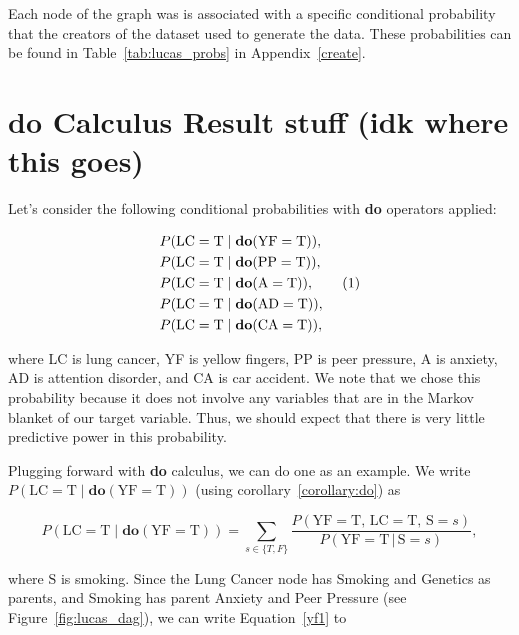 \documentclass{article}
\newcommand\numberthis{\addtocounter{equation}{1}\tag{\theequation}}
\begin{document}
Each node of the graph was is associated with a specific conditional probability that the
creators of the dataset used to generate the data. These probabilities can be found in Table~\ref{tab:lucas_probs}
in Appendix~\ref{create}.


\section{do Calculus Result stuff (idk where this goes)}

Let's consider the following conditional probabilities with \textbf{do} operators applied:

\begin{align*}
    P(\text{LC} = \text{T} \;&|\; \textbf{do}(\text{YF} = \text{T})), \\
    P(\text{LC} = \text{T} \;&|\; \textbf{do}(\text{PP} = \text{T})), \\
    P(\text{LC} = \text{T} \;&|\; \textbf{do}(\text{A} = \text{T})), \numberthis \label{do_list}\\
    P(\text{LC} = \text{T} \;&|\; \textbf{do}(\text{AD} = \text{T})), \\
    P(\text{LC} = \text{T} \;&|\; \textbf{do}(\text{CA} = \text{T})), \\
\end{align*}

where LC is lung cancer, YF is yellow fingers, PP is peer pressure, A is anxiety, AD is attention disorder, and CA 
is car accident. We note that we chose this probability because it does not involve any
variables that are in the Markov blanket of our target variable. Thus, we should expect that there is very little
predictive power in this probability.

Plugging forward with \textbf{do} calculus, we can do one as an example. We write $P(\text{LC} = \text{T} \;|\; \textbf{do}(\text{YF} = \text{T}))$
(using corollary~\ref{corollary:do}) as

\begin{equation}
    P(\text{LC} = \text{T} \;|\; \textbf{do}(\text{YF} = \text{T})) = 
    \sum_{s\in\{T, F\}} \frac{P(\text{YF} = \text{T},\, \text{LC} = \text{T},\, \text{S} = s)}{P(\text{YF} = \text{T}\,|\, \text{S} = s)},
    \label{yf1}
\end{equation}

where $\text{S}$ is smoking. Since the Lung Cancer node has Smoking and Genetics as parents, and Smoking
has parent Anxiety and Peer Pressure (see Figure~\ref{fig:lucas_dag}), we can write Equation~\ref{yf1} to
\end{document}
